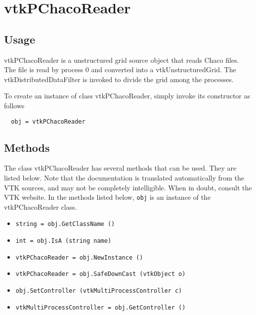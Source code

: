 \section{vtkPChacoReader}

\subsection{Usage}

 vtkPChacoReader is a unstructured grid source object that reads
 Chaco files.  The file is read by process 0 and converted into
 a vtkUnstructuredGrid.  The vtkDistributedDataFilter is invoked
 to divide the grid among the processes.  

To create an instance of class vtkPChacoReader, simply
invoke its constructor as follows
\begin{verbatim}
  obj = vtkPChacoReader
\end{verbatim}
\subsection{Methods}

The class vtkPChacoReader has several methods that can be used.
  They are listed below.
Note that the documentation is translated automatically from the VTK sources,
and may not be completely intelligible.  When in doubt, consult the VTK website.
In the methods listed below, \verb|obj| is an instance of the vtkPChacoReader class.
\begin{itemize}
\item  \verb|string = obj.GetClassName ()|

\item  \verb|int = obj.IsA (string name)|

\item  \verb|vtkPChacoReader = obj.NewInstance ()|

\item  \verb|vtkPChacoReader = obj.SafeDownCast (vtkObject o)|

\item  \verb|obj.SetController (vtkMultiProcessController c)|

\item  \verb|vtkMultiProcessController = obj.GetController ()|

\end{itemize}
